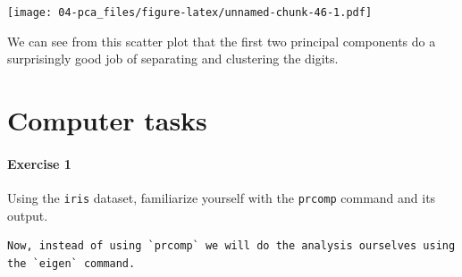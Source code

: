 \documentclass[]{book}
\newenvironment{Shaded}{\begin{snugshade}}{\end{snugshade}}
\newcommand{\CommentTok}[1]{\textcolor[rgb]{0.56,0.35,0.01}{\textit{#1}}}
\newcommand{\DataTypeTok}[1]{\textcolor[rgb]{0.13,0.29,0.53}{#1}}
\newcommand{\DecValTok}[1]{\textcolor[rgb]{0.00,0.00,0.81}{#1}}
\newcommand{\KeywordTok}[1]{\textcolor[rgb]{0.13,0.29,0.53}{\textbf{#1}}}
\newcommand{\NormalTok}[1]{#1}
\newcommand{\OperatorTok}[1]{\textcolor[rgb]{0.81,0.36,0.00}{\textbf{#1}}}
\newcommand{\StringTok}[1]{\textcolor[rgb]{0.31,0.60,0.02}{#1}}
\let\oldparagraph\paragraph
\renewcommand{\paragraph}[1]{\oldparagraph{#1}\mbox{}}
\theoremstyle{definition}
\theoremstyle{definition}
\theoremstyle{definition}
\theoremstyle{remark}
\begin{document}
\begin{Shaded}
\end{Shaded}

\texttt{[image: 04-pca\_files/figure-latex/unnamed-chunk-46-1.pdf]}

We can see from this scatter plot that the first two principal components do a surprisingly good job of separating and clustering the digits.

\hypertarget{pca-comptask}{%
\section{Computer tasks}\label{pca-comptask}}

\hypertarget{exercise-1}{%
\paragraph{Exercise 1}\label{exercise-1}}

Using the \texttt{iris} dataset, familiarize yourself with the \texttt{prcomp} command and its output.

\begin{verbatim}
Now, instead of using `prcomp` we will do the analysis ourselves using the `eigen` command. 
\end{verbatim}
\end{document}
